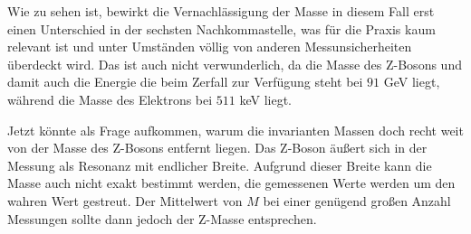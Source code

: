 Wie zu sehen ist, bewirkt die Vernachlässigung der Masse in diesem Fall erst einen Unterschied in der sechsten Nachkommastelle, was für die Praxis kaum relevant ist und unter Umständen völlig von anderen Messunsicherheiten überdeckt wird.
Das ist auch nicht verwunderlich, da die Masse des Z-Bosons und damit auch die Energie die beim Zerfall zur Verfügung steht bei $91$ GeV liegt, während die Masse des Elektrons bei $511$ keV liegt.

Jetzt könnte als Frage aufkommen, warum die invarianten Massen doch recht weit von der Masse des Z-Bosons entfernt liegen.
Das Z-Boson äußert sich in der Messung als Resonanz mit endlicher Breite.
Aufgrund dieser Breite kann die Masse auch nicht exakt bestimmt werden, die gemessenen Werte werden um den wahren Wert gestreut.
Der Mittelwert von $M$ bei einer genügend großen Anzahl Messungen sollte dann jedoch der Z-Masse entsprechen.
\clearpage
